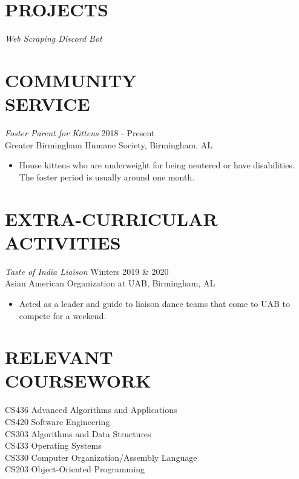 \documentclass[margin, 10pt]{res} %
\begin{document}
\begin{resume}
\section{PROJECTS}

{\sl Web Scraping Discord Bot}
\begin{itemize} \itemsep -2pt %

\end{itemize}

\section{COMMUNITY \\ SERVICE}

{\sl Foster Parent for Kittens} \hfill 2018 - Present \\
Greater Birmingham Humane Society, Birmingham, AL
\begin{itemize}
\item House kittens who are underweight for being neutered or have disabilities. The foster period is usually around one month.
\end{itemize}


\section{EXTRA-CURRICULAR \\ ACTIVITIES} 

{\sl Taste of India Liaison} \hfill Winters 2019 \& 2020 \\
Asian American Organization at UAB, Birmingham, AL
\begin{itemize}
\item Acted as a leader and guide to liaison dance teams that come to UAB to compete for a weekend.
\end{itemize}

\section{RELEVANT \\ COURSEWORK}

CS436 Advanced Algorithms and Applications \\
CS420 Software Engineering \\
CS303 Algorithms and Data Structures \\
CS433 Operating Systems \\
CS330 Computer Organization/Assembly Language \\
CS203 Object-Oriented Programming



\end{resume}
\end{document}
